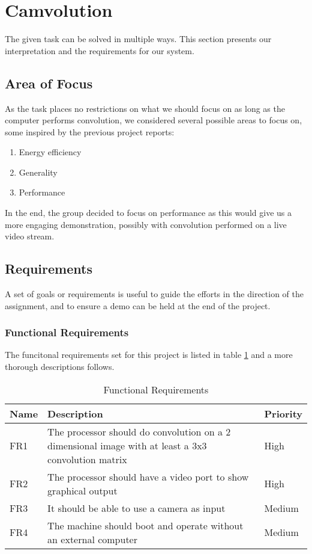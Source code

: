 \section{Camvolution}
The given task can be solved in multiple ways. This section presents our interpretation and the requirements for our system.

\subsection{Area of Focus}
As the task places no restrictions on what we should focus on as long as the computer performs convolution, we considered several possible areas to focus on, some inspired by the previous project reports:

\begin{enumerate}
    \item Energy efficiency
    \item Generality
    \item Performance
\end{enumerate}

In the end, the group decided to focus on performance as this would give us a more engaging demonstration, possibly with convolution performed on a live video stream.

\subsection{Requirements}
A set of goals or requirements is useful to guide the efforts in the direction of the assignment, and to ensure a demo can be held at the end of the project.

\subsubsection{Functional Requirements}
The funcitonal requirements set for this project is listed in table \ref{tab:functional-requirements} and a more thorough descriptions follows.

\begin{table}[h]
    \centering
    \label{tab:functional-requirements}
    \begin{tabular}{lp{12cm}l}
        Name & Description & Priority \\
        \hline
        FR1 &
            The processor should do convolution on a 2 dimensional image with at least a 3x3 convolution matrix &
            High \\
        FR2 &
            The processor should have a video port to show graphical output &
            High \\
        FR3 &
            It should be able to use a camera as input &
            Medium \\
        FR4 &
            The machine should boot and operate without an external computer &
            Medium
    \end{tabular}
    \caption{Functional Requirements}
\end{table}

